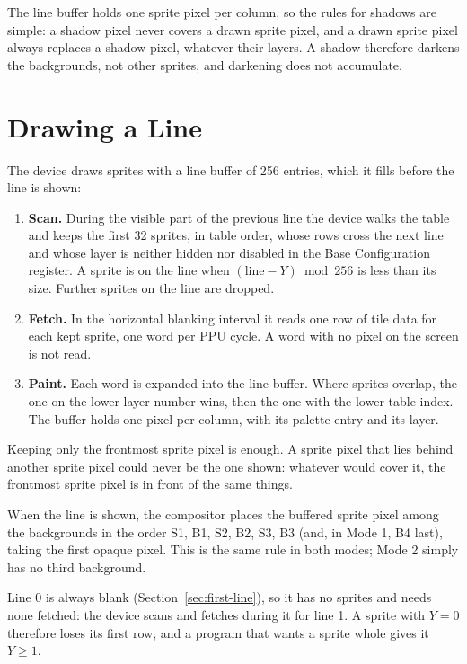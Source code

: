 The line buffer holds one sprite pixel per column, so the rules for shadows are simple: a shadow pixel never covers a
drawn sprite pixel, and a drawn sprite pixel always replaces a shadow pixel, whatever their layers. A shadow therefore
darkens the backgrounds, not other sprites, and darkening does not accumulate.

\section{Drawing a Line}
\label{sec:sprite-line}

The device draws sprites with a line buffer of 256 entries, which it fills before the line is shown:

\begin{enumerate}
	\item \textbf{Scan.} During the visible part of the previous line the device walks the table and keeps the first 32
	      sprites, in table order, whose rows cross the next line and whose layer is neither hidden nor disabled in the Base
	      Configuration register. A sprite is on the line when $(\text{line} - Y) \bmod 256$ is less than its size.
	      Further sprites on the line are dropped.
	\item \textbf{Fetch.} In the horizontal blanking interval it reads one row of tile data for each kept sprite, one
	      word per PPU cycle. A word with no pixel on the screen is not read.
	\item \textbf{Paint.} Each word is expanded into the line buffer. Where sprites overlap, the one on the lower layer
	      number wins, then the one with the lower table index. The buffer holds one pixel per column, with its palette
	      entry and its layer.
\end{enumerate}

Keeping only the frontmost sprite pixel is enough. A sprite pixel that lies behind another sprite pixel could never be
the one shown: whatever would cover it, the frontmost sprite pixel is in front of the same things.

When the line is shown, the compositor places the buffered sprite pixel among the backgrounds in the order S1, B1, S2,
B2, S3, B3 (and, in Mode 1, B4 last), taking the first opaque pixel. This is the same rule in both modes; Mode 2 simply
has no third background.

Line 0 is always blank (Section~\ref{sec:first-line}), so it has no sprites and needs none fetched: the device scans
and fetches during it for line 1. A sprite with $Y = 0$ therefore loses its first row, and a program that wants a
sprite whole gives it $Y \geq 1$.


